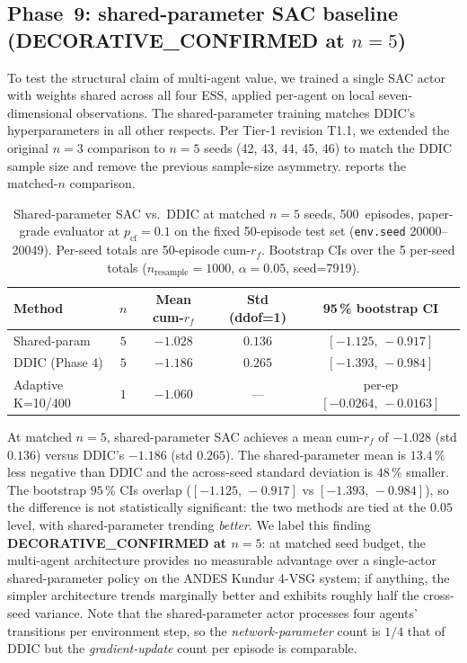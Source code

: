 \documentclass[journal,onecolumn,11pt]{IEEEtran}
\begin{document}
\subsection{Phase~9: shared-parameter SAC baseline (DECORATIVE\_CONFIRMED at $n = 5$)}

To test the structural claim of multi-agent value, we trained a
single SAC actor with weights shared across all four ESS, applied
per-agent on local seven-dimensional observations. The shared-parameter
training matches DDIC's hyperparameters in all other respects. Per
Tier-1 revision T1.1, we extended the original $n = 3$ comparison to
$n = 5$ seeds (42, 43, 44, 45, 46) to match the DDIC sample size and
remove the previous sample-size asymmetry.  reports
the matched-$n$ comparison.

\begin{table}[!t]
  \centering
  \caption{Shared-parameter SAC vs.\ DDIC at matched $n = 5$ seeds,
  500~episodes, paper-grade evaluator at $p_{\text{cf}} = 0.1$ on
  the fixed 50-episode test set (\texttt{env.seed} 20000--20049).
  Per-seed totals are 50-episode cum-$r_f$. Bootstrap CIs over the
  5 per-seed totals (\(n_{\text{resample}}=1000\), \(\alpha=0.05\),
  seed=7919).}
  \label{tab:phase9}
  \footnotesize
  \begin{tabular}{lcccc}
    \toprule
    Method & $n$ & Mean cum-$r_f$ & Std (ddof=1) & 95\,\% bootstrap CI \\
    \midrule
    Shared-param      & $5$ & $\mathbf{-1.028}$ & $0.136$ & $[-1.125,\,-0.917]$ \\
    DDIC (Phase 4)    & $5$ & $-1.186$ & $0.265$ & $[-1.393,\,-0.984]$ \\
    Adaptive K=10/400 & $1$ & $-1.060$ & --- & per-ep $[-0.0264,\,-0.0163]$ \\
    \bottomrule
  \end{tabular}
\end{table}

At matched $n = 5$, shared-parameter SAC achieves a mean cum-$r_f$ of
$-1.028$ (std $0.136$) versus DDIC's $-1.186$ (std $0.265$). The
shared-parameter mean is $13.4\,\%$ less negative than DDIC and the
across-seed standard deviation is $48\,\%$ smaller. The bootstrap
$95\,\%$ CIs overlap ($[-1.125,\,-0.917]$ vs $[-1.393,\,-0.984]$),
so the difference is not statistically significant: the two methods
are tied at the $0.05$ level, with shared-parameter trending
\emph{better}. We label this finding
\textbf{DECORATIVE\_CONFIRMED at $n = 5$}: at matched seed budget,
the multi-agent architecture provides no measurable advantage over
a single-actor shared-parameter policy on the ANDES Kundur 4-VSG
system; if anything, the simpler architecture trends marginally
better and exhibits roughly half the cross-seed variance. Note that
the shared-parameter actor processes four agents' transitions per
environment step, so the \emph{network-parameter} count is $1/4$
that of DDIC but the \emph{gradient-update} count per episode is
comparable.
\end{document}
